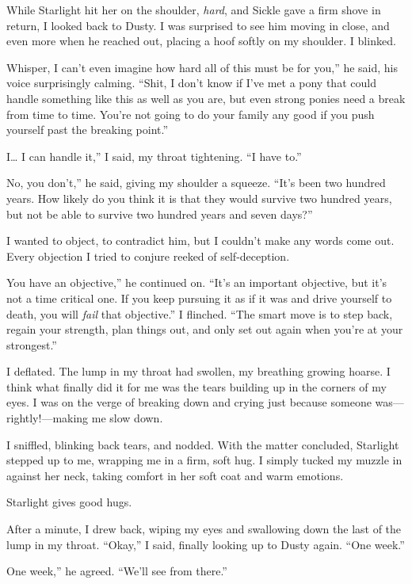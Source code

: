 While Starlight hit her on the shoulder, \textit{hard}, and Sickle gave a firm shove in return, I looked back to Dusty. I was surprised to see him moving in close, and even more when he reached out, placing a hoof softly on my shoulder. I blinked.

\leavevmode{}Whisper, I can’t even imagine how hard all of this must be for you,” he said, his voice surprisingly calming. “Shit, I don’t know if I’ve met a pony that could handle something like this as well as you are, but even strong ponies need a break from time to time. You’re not going to do your family any good if you push yourself past the breaking point.”

\leavevmode{}I… I can handle it,” I said, my throat tightening. “I have to.”

\leavevmode{}No, you don’t,” he said, giving my shoulder a squeeze. “It’s been two hundred years. How likely do you think it is that they would survive two hundred years, but not be able to survive two hundred years and seven days?”

I wanted to object, to contradict him, but I couldn’t make any words come out. Every objection I tried to conjure reeked of self-deception.

\leavevmode{}You have an objective,” he continued on. “It’s an important objective, but it’s not a time critical one. If you keep pursuing it as if it was and drive yourself to death, you will \textit{fail} that objective.” I flinched. “The smart move is to step back, regain your strength, plan things out, and only set out again when you’re at your strongest.”

I deflated. The lump in my throat had swollen, my breathing growing hoarse. I think what finally did it for me was the tears building up in the corners of my eyes. I was on the verge of breaking down and crying just because someone was—rightly!—making me slow down.

I sniffled, blinking back tears, and nodded. With the matter concluded, Starlight stepped up to me, wrapping me in a firm, soft hug. I simply tucked my muzzle in against her neck, taking comfort in her soft coat and warm emotions.

Starlight gives good hugs.

After a minute, I drew back, wiping my eyes and swallowing down the last of the lump in my throat. “Okay,” I said, finally looking up to Dusty again. “One week.”

\leavevmode{}One week,” he agreed. “We’ll see from there.”

